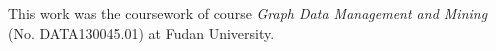 \documentclass[sigconf, nonacm]{acmart}
\begin{document}




 



\begin{acks}
This work was the coursework of course \emph{Graph Data Management and Mining} (No. DATA130045.01) at Fudan University.
\end{acks}



%

\end{document}
